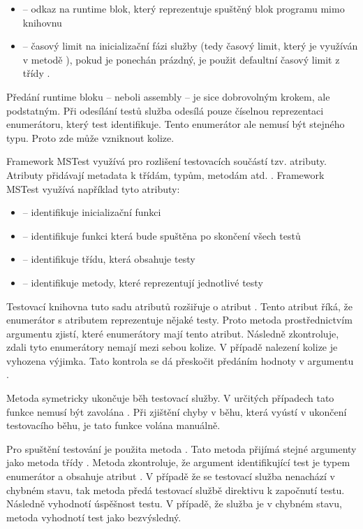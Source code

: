 \begin{itemize}
    \item {} -- odkaz na runtime blok, který reprezentuje spuštěný blok programu mimo knihovnu
    \item {} -- časový limit na inicializační fázi služby (tedy časový limit, který je využíván v metodě ), pokud je ponechán prázdný, je použit defaultní časový limit z třídy .
\end{itemize}

Předání runtime bloku -- neboli assembly -- je sice dobrovolným krokem, ale podstatným. Při odesílání testů služba odesílá pouze číselnou reprezentaci enumerátoru, který test identifikuje. Tento enumerátor ale nemusí být stejného typu. Proto zde může vzniknout kolize.

Framework MSTest využívá pro rozlišení testovacích součástí tzv. atributy. Atributy přidávají metadata k třídám, typům, metodám atd. \cite{attribute_docs}. Framework MSTest využívá například tyto atributy:

\begin{itemize}
    \item {} -- identifikuje inicializační funkci
    \item {} -- identifikuje funkci která bude spuštěna po skončení všech testů
    \item {} -- identifikuje třídu, která obsahuje testy
    \item {} -- identifikuje metody, které reprezentují jednotlivé testy
\end{itemize}

Testovací knihovna tuto sadu atributů rozšiřuje o atribut . Tento atribut říká, že enumerátor s atributem  reprezentuje nějaké testy. Proto metoda  prostřednictvím argumentu  zjistí, které enumerátory mají tento atribut. Následně zkontroluje, zdali tyto enumerátory nemají mezi sebou kolize. V případě nalezení kolize je vyhozena výjimka. Tato kontrola se dá přeskočit předáním hodnoty  v argumentu .

Metoda  symetricky ukončuje běh testovací služby. V určitých případech tato funkce nemusí být zavolána . Při zjištění chyby v běhu, která vyústí v ukončení testovacího běhu, je tato funkce volána manuálně.

Pro spuštění testování je použita metoda . Tato metoda přijímá stejné argumenty jako metoda  třídy . Metoda zkontroluje, že argument identifikující test je typem enumerátor a obsahuje atribut . V případě že se testovací služba nenachází v chybném stavu, tak metoda předá testovací službě direktivu k započnutí testu. Následně vyhodnotí úspěšnost testu. V případě, že služba je v chybném stavu, metoda vyhodnotí test jako bezvýsledný. 
 